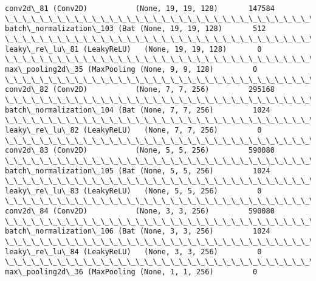 \documentclass[11pt]{article}
\begin{document}
\begin{Verbatim}[commandchars=\\\{\}]
conv2d\_81 (Conv2D)           (None, 19, 19, 128)       147584    
\_\_\_\_\_\_\_\_\_\_\_\_\_\_\_\_\_\_\_\_\_\_\_\_\_\_\_\_\_\_\_\_\_\_\_\_\_\_\_\_\_\_\_\_\_\_\_\_\_\_\_\_\_\_\_\_\_\_\_\_\_\_\_\_\_
batch\_normalization\_103 (Bat (None, 19, 19, 128)       512       
\_\_\_\_\_\_\_\_\_\_\_\_\_\_\_\_\_\_\_\_\_\_\_\_\_\_\_\_\_\_\_\_\_\_\_\_\_\_\_\_\_\_\_\_\_\_\_\_\_\_\_\_\_\_\_\_\_\_\_\_\_\_\_\_\_
leaky\_re\_lu\_81 (LeakyReLU)   (None, 19, 19, 128)       0         
\_\_\_\_\_\_\_\_\_\_\_\_\_\_\_\_\_\_\_\_\_\_\_\_\_\_\_\_\_\_\_\_\_\_\_\_\_\_\_\_\_\_\_\_\_\_\_\_\_\_\_\_\_\_\_\_\_\_\_\_\_\_\_\_\_
max\_pooling2d\_35 (MaxPooling (None, 9, 9, 128)         0         
\_\_\_\_\_\_\_\_\_\_\_\_\_\_\_\_\_\_\_\_\_\_\_\_\_\_\_\_\_\_\_\_\_\_\_\_\_\_\_\_\_\_\_\_\_\_\_\_\_\_\_\_\_\_\_\_\_\_\_\_\_\_\_\_\_
conv2d\_82 (Conv2D)           (None, 7, 7, 256)         295168    
\_\_\_\_\_\_\_\_\_\_\_\_\_\_\_\_\_\_\_\_\_\_\_\_\_\_\_\_\_\_\_\_\_\_\_\_\_\_\_\_\_\_\_\_\_\_\_\_\_\_\_\_\_\_\_\_\_\_\_\_\_\_\_\_\_
batch\_normalization\_104 (Bat (None, 7, 7, 256)         1024      
\_\_\_\_\_\_\_\_\_\_\_\_\_\_\_\_\_\_\_\_\_\_\_\_\_\_\_\_\_\_\_\_\_\_\_\_\_\_\_\_\_\_\_\_\_\_\_\_\_\_\_\_\_\_\_\_\_\_\_\_\_\_\_\_\_
leaky\_re\_lu\_82 (LeakyReLU)   (None, 7, 7, 256)         0         
\_\_\_\_\_\_\_\_\_\_\_\_\_\_\_\_\_\_\_\_\_\_\_\_\_\_\_\_\_\_\_\_\_\_\_\_\_\_\_\_\_\_\_\_\_\_\_\_\_\_\_\_\_\_\_\_\_\_\_\_\_\_\_\_\_
conv2d\_83 (Conv2D)           (None, 5, 5, 256)         590080    
\_\_\_\_\_\_\_\_\_\_\_\_\_\_\_\_\_\_\_\_\_\_\_\_\_\_\_\_\_\_\_\_\_\_\_\_\_\_\_\_\_\_\_\_\_\_\_\_\_\_\_\_\_\_\_\_\_\_\_\_\_\_\_\_\_
batch\_normalization\_105 (Bat (None, 5, 5, 256)         1024      
\_\_\_\_\_\_\_\_\_\_\_\_\_\_\_\_\_\_\_\_\_\_\_\_\_\_\_\_\_\_\_\_\_\_\_\_\_\_\_\_\_\_\_\_\_\_\_\_\_\_\_\_\_\_\_\_\_\_\_\_\_\_\_\_\_
leaky\_re\_lu\_83 (LeakyReLU)   (None, 5, 5, 256)         0         
\_\_\_\_\_\_\_\_\_\_\_\_\_\_\_\_\_\_\_\_\_\_\_\_\_\_\_\_\_\_\_\_\_\_\_\_\_\_\_\_\_\_\_\_\_\_\_\_\_\_\_\_\_\_\_\_\_\_\_\_\_\_\_\_\_
conv2d\_84 (Conv2D)           (None, 3, 3, 256)         590080    
\_\_\_\_\_\_\_\_\_\_\_\_\_\_\_\_\_\_\_\_\_\_\_\_\_\_\_\_\_\_\_\_\_\_\_\_\_\_\_\_\_\_\_\_\_\_\_\_\_\_\_\_\_\_\_\_\_\_\_\_\_\_\_\_\_
batch\_normalization\_106 (Bat (None, 3, 3, 256)         1024      
\_\_\_\_\_\_\_\_\_\_\_\_\_\_\_\_\_\_\_\_\_\_\_\_\_\_\_\_\_\_\_\_\_\_\_\_\_\_\_\_\_\_\_\_\_\_\_\_\_\_\_\_\_\_\_\_\_\_\_\_\_\_\_\_\_
leaky\_re\_lu\_84 (LeakyReLU)   (None, 3, 3, 256)         0         
\_\_\_\_\_\_\_\_\_\_\_\_\_\_\_\_\_\_\_\_\_\_\_\_\_\_\_\_\_\_\_\_\_\_\_\_\_\_\_\_\_\_\_\_\_\_\_\_\_\_\_\_\_\_\_\_\_\_\_\_\_\_\_\_\_
max\_pooling2d\_36 (MaxPooling (None, 1, 1, 256)         0         

\end{Verbatim}
\end{document}
